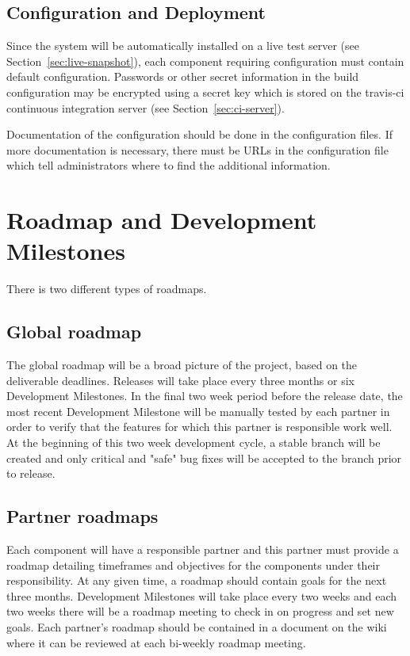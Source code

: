 \subsection{Configuration and Deployment}
\label{sec:deployment-process}

Since the system will be automatically installed on a live test server
(see Section~\ref{sec:live-snapshot}), each component requiring configuration must
contain default configuration. Passwords or other secret information in the build
configuration may be encrypted using a secret key which is stored on the travis-ci
continuous integration server (see Section~\ref{sec:ci-server}).

Documentation of the configuration should be done in the configuration files. If more
documentation is necessary, there must be URLs in the configuration file which tell
administrators where to find the additional information.

\section{Roadmap and Development Milestones}
\label{sec:roadmap}

There is two different types of roadmaps.

\subsection{Global roadmap}
\label{sec:global-roadmap}

The global roadmap will be a broad picture of the project, based on the deliverable
deadlines. Releases will take place every three months or six Development Milestones.
In the final two week period before the release date, the most recent Development
Milestone will be manually tested by each partner in order to verify that the
features for which this partner is responsible work well. At the beginning of this
two week development cycle, a stable branch will be created and only critical and
"safe" bug fixes will be accepted to the branch prior to release.

\subsection{Partner roadmaps}
\label{sec:partner-roadmaps}

Each component will have a responsible partner and this partner must provide a roadmap
detailing timeframes and objectives for the components under their responsibility. At any
given time, a roadmap should contain goals for the next three months.
Development Milestones will take place every two weeks and each two weeks there will be
a roadmap meeting to check in on progress and set new goals. Each partner's roadmap
should be contained in a document on the wiki where it can be reviewed at each bi-weekly
roadmap meeting.


